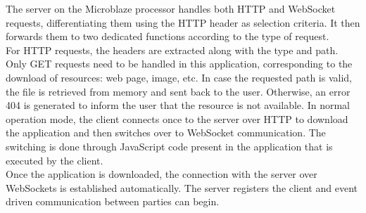       The server on the Microblaze processor handles both HTTP and WebSocket requests, differentiating them using the HTTP header as selection criteria. It then forwards them to two dedicated functions according to the type of request. \\

      For HTTP requests, the headers are extracted along with the type and path. Only GET requests need to be handled in this application, corresponding to the download of resources: web page, image, etc. In case the requested path is valid, the file is retrieved from memory and sent back to the user. Otherwise, an error 404 is generated to inform the user that the resource is not available. In normal operation mode, the client connects once to the server over HTTP to download the application and then switches over to WebSocket communication. The switching is done through JavaScript code present in the application that is executed by the client. \\

      Once the application is downloaded, the connection with the server over WebSockets is established automatically. The server registers the client and event driven communication between parties can begin.

